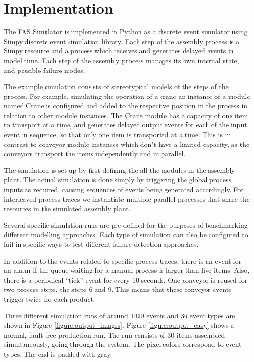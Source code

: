 \documentclass[procedia]{easychair}
\begin{document}
\section{Implementation}

The FAS Simulator\cite{FASSimulator} is implemented in Python as a discrete event simulator using Simpy discrete event simulation library.
Each step of the assembly process is a Simpy resource and a process which receives and generates
delayed events in model time. Each step of the assembly process manages its own internal state, and possible failure modes.

The example simulation consists of stereotypical models of the steps of the process. For example, simulating
the operation of a crane an instance of a module named Crane is configured and added to the respective position in the process in relation to other module instances.
The Crane module has a capacity of one item to transport at a time, and generates delayed output events for each of the input event in sequence, so that only one item is
transported at a time. This is in contrast to conveyor module instances which don't have a limited capacity, as the conveyors transport the items independently and in parallel.

The simulation is set up by first defining the all the modules in the assembly plant. The actual simulation
is done simply by triggering the global process inputs as required, causing sequences of events being generated accordingly. For interleaved process traces we instantiate multiple
parallel processes that share the resources in the simulated assembly plant.

Several specific simulation runs are pre-defined for the purposes of benchmarking
different modelling approaches.
Each type of simulation can also be configured to fail in specific ways to test different failure detection approaches.

In addition to the events related to specific process traces, there is an event for an alarm if the queue waiting for a manual process is larger than five items. Also, there is
a periodical ``tick'' event for every 10 seconds. One conveyor is reused for two process steps, the steps 6 and 9. This means that these conveyor events
trigger twice for each product.

Three different simulation runs of around 1400 events and 36 event types are shown in Figure \ref{figure:output_images}. Figure \ref{figure:output_easy} shows a normal, fault-free production run.
The run consists of 30 items assembled simultaneously, going through the system.
The pixel colors correspond to event types. The end is padded with gray.
\end{document}
